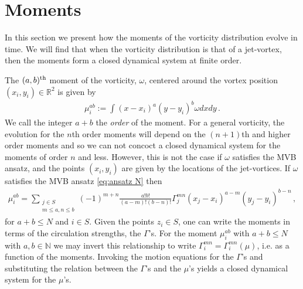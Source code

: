 \documentclass[12pt]{amsart}
\newcommand{\R}{\ensuremath{\mathbb{R}}}
\theoremstyle{remark}
\begin{document}
\section{Moments}
\label{sec:moments}
	In this section we present how the moments of the vorticity distribution evolve in time.
	We will find that when the vorticity distribution is that of a jet-vortex, then the moments form a closed dynamical system at finite order.
	
	The $(a,b)^{\rm th}$ moment of the vorticity, $\omega$, centered around the vortex position $(x_i,y_i) \in \R^2$ is given by
	\begin{align*}
		\mu^{ab}_i := \int (x-x_i)^a (y-y_i)^b \omega dxdy\,.
	\end{align*}
	We call the integer $a+b$ the \emph{order} of the moment.
	For a general vorticity, the evolution for the $n$th order moments will depend on the $(n+1)$th and higher order moments
	and so we can not concoct a closed dynamical system for the moments of order $n$ and less.
	However, this is not the case if $\omega$ satisfies the MVB ansatz, and the points $(x_i,y_i)$ are given by the locations of the jet-vortices.
	If $\omega$ satisfies the MVB ansatz \eqref{eq:ansatz N} then
	\begin{align*}
		\mu^{ab}_i = \sum_{
			\substack{
				j \in S \\
				m \leq a ,
				n \leq b
			}
		}
		(-1)^{m+n} \frac{a! b!}{(a-m)!(b-n)!} \Gamma_j^{mn} (x_j - x_i)^{a-m} (y_j - y_i)^{b-n}\,,
	\end{align*}
	for $a+b \leq N$ and $i \in S$.
	Given the points $z_i \in S$, one can write the moments in terms of the circulation
	strengths, the $\Gamma$'s.
	For the moment $\mu_i^{ab}$ with $a+b \leq N$ with $a,b \in \mathbb{N}$
	we may invert this relationship to write $\Gamma_i^{mn} = \Gamma_i^{mn}( \mu)$, i.e. as a function of the moments.
	Invoking the motion equations for the $\Gamma$'s and substituting the relation between the $\Gamma$'s and the $\mu$'s yields a closed dynamical system for the $\mu$'s.
	
\end{document}
